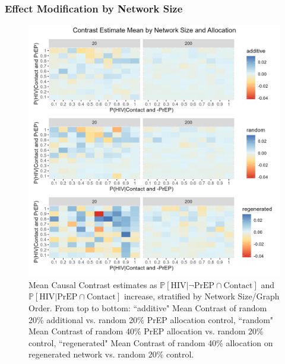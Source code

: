 \documentclass{article}
\theoremstyle{definition}
\begin{document}
\subsubsection{Effect Modification by Network Size}
\begin{figure}[H]
    \centering
    \includegraphics[width=\linewidth]{Figures/Network Size Mean Plot.png}
    \caption{Mean Causal Contrast estimates as $\mathbb{P}\left[\text{HIV} \vert \neg \text{PrEP} \cap \text{Contact}\right]$ and $\mathbb{P}\left[\text{HIV} \vert \text{PrEP} \cap \text{Contact}\right]$ increase, stratified by Network Size/Graph Order. From top to bottom: ``additive" Mean Contrast of random 20\% additional vs. random 20\% PrEP allocation control, ``random" Mean Contrast of random 40\% PrEP allocation vs. random 20\% control, ``regenerated" Mean Contrast of random 40\% allocation on regenerated network vs. random 20\% control. }
    \label{fig: Figure S4.1}
\end{figure}
\end{document}

